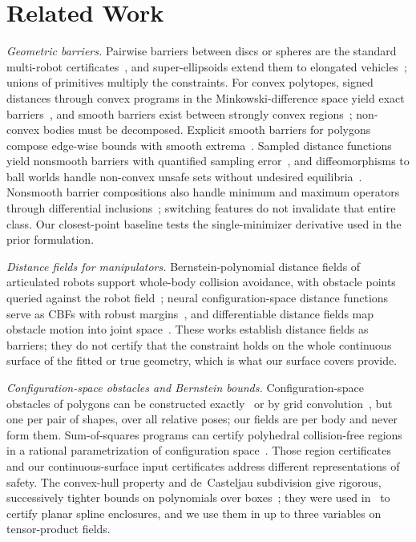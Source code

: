 \documentclass[journal]{IEEEtran}
\theoremstyle{definition}
\begin{document}
\section{Related Work}\label{sec:related}

\emph{Geometric barriers.} Pairwise barriers between discs or spheres are the standard multi-robot
certificates~\cite{wang2017safety}, and super-ellipsoids extend them to elongated
vehicles~\cite{wang2017quadrotors}; unions of primitives multiply the constraints. For convex
polytopes, signed distances through convex programs in the Minkowski-difference space yield exact
barriers~\cite{chen2025minkowski,chen2026exact}, and smooth barriers exist between strongly convex
regions~\cite{thirugnanam2025strongly}; non-convex bodies must be decomposed. Explicit smooth
barriers for polygons compose edge-wise bounds with smooth extrema~\cite{wu2025optimization}.
Sampled distance functions yield nonsmooth barriers with quantified sampling
error~\cite{lutkus2025sampling}, and diffeomorphisms to ball worlds handle non-convex unsafe sets
without undesired equilibria~\cite{notomista2021nonconvex}.
Nonsmooth barrier compositions also handle minimum and maximum operators through differential
inclusions~\cite{glotfelter2017nonsmooth}; switching features do not invalidate that entire class.
Our closest-point baseline tests the single-minimizer derivative used in the prior formulation.

\emph{Distance fields for manipulators.} Bernstein-polynomial distance fields of articulated robots
support whole-body collision avoidance, with obstacle points queried against the robot
field~\cite{li2024representing}; neural configuration-space distance functions serve as CBFs with
robust margins~\cite{long2025neural}, and differentiable distance fields map obstacle motion into
joint space~\cite{chi2024safe}. These works establish distance fields as barriers; they do not
certify that the constraint holds on the whole continuous surface of the fitted or true geometry,
which is what our surface covers provide.

\emph{Configuration-space obstacles and Bernstein bounds.} Configuration-space obstacles of polygons
can be constructed exactly~\cite{lozanoperez1983spatial,latombe1991robot} or by grid
convolution~\cite{kavraki1995fft}, but one per pair of shapes, over all relative poses; our fields
are per body and never form them. Sum-of-squares programs can certify polyhedral collision-free
regions in a rational parametrization of configuration space~\cite{dai2024certified}.
Those region certificates and our continuous-surface input certificates address different
representations of safety. The
convex-hull property and de~Casteljau subdivision give rigorous, successively tighter bounds on
polynomials over boxes~\cite{farin2002curves,sherbrooke1993computation}; they were used
in~\cite{jo2027semantic} to certify planar spline enclosures, and we use them in up to three
variables on tensor-product fields.
\end{document}
